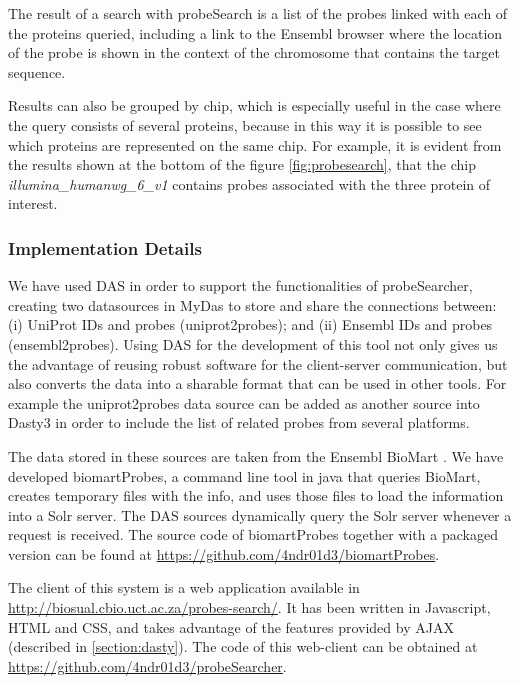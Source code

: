 The result of a search with probeSearch is a list of the probes linked with each of the proteins queried, including a link to the Ensembl browser where the location of the probe is shown in the context of the chromosome that contains the target sequence.

Results can also be grouped by chip, which is especially useful in the case where the query consists of several proteins, because in this way it is possible to see which proteins are represented on the same chip. For example, it is evident from the results shown at the bottom of the figure \ref{fig:probesearch}, that the chip \emph{illumina\_humanwg\_6\_v1} contains probes associated with the three protein of interest.
 
\subsubsection{Implementation Details}
We have used DAS in order to support the functionalities of probeSearcher, creating two datasources in MyDas to store and share the connections between: (i)   UniProt IDs and probes (uniprot2probes); and (ii) Ensembl IDs and probes (ensembl2probes). Using DAS for the development of this tool not only gives us the advantage of reusing robust software for the client-server communication, but also converts the data into a sharable format that can be used in other tools. For example the uniprot2probes data source can be added as another source into Dasty3 in order to include the list of related probes from several platforms.

The data stored in these sources are taken from the Ensembl BioMart \cite{KIN2011}. We have developed biomartProbes, a command line tool in java that queries BioMart, creates temporary files with the info, and uses those files to load the information into a Solr server. The DAS sources dynamically query the Solr server whenever a request is received. The source code of biomartProbes together with a packaged version can be found at \url{https://github.com/4ndr01d3/biomartProbes}.

The client of this system is a web application available in \url{http://biosual.cbio.uct.ac.za/probes-search/}. It has been written in Javascript, HTML and CSS, and takes advantage of the features provided by AJAX (described in \ref{section:dasty}). The code of this web-client can be obtained at \url{https://github.com/4ndr01d3/probeSearcher}.

